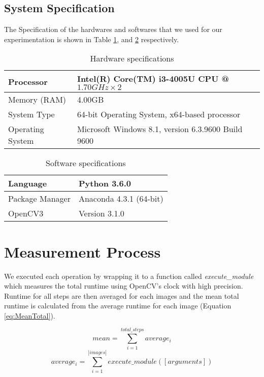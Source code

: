 \subsection{System Specification}
The Specification of the hardwares and softwares that we used for our experimentation is shown in Table \ref{table:HardwareSpecification}, and \ref{table:SoftwareSpecification} respectively.

\begin{table}[hb]
\centering
\caption{Hardware specifications}
\label{table:HardwareSpecification}
\begin{tabular}{|l|l|}
\hline
Processor & Intel(R) Core(TM) i3-4005U CPU @ $1.70GHz \times 2$ \\
\hline
Memory (RAM) & 4.00GB \\ 
\hline
System Type & 64-bit Operating System, x64-based processor \\ 
\hline
Operating System & Microsoft Windows 8.1, version 6.3.9600 Build 9600 \\
\hline 
\end{tabular}
\end{table} 

\begin{table}[hb]
\centering
\caption{Software specifications}
\label{table:SoftwareSpecification}
\begin{tabular}{|l|l|}
\hline
Language & Python 3.6.0 \\ 
\hline
Package Manager & Anaconda 4.3.1 (64-bit) \\ 
\hline
OpenCV3 & Version 3.1.0 \\
\hline
\end{tabular}
\end{table} 

\section{Measurement Process}
We executed each operation by wrapping it to a function called {\it execute\_module} which measures the total runtime using OpenCV's clock with high precision. Runtime for all steps are then averaged for each images and the mean total runtime is calculated from the average runtime for each image (Equation \ref{eq:MeanTotal}).

\begin{equation}\label{eq:MeanTotal}
mean = \sum^{total\_steps}_{i=1}{average_i}
\end{equation}
\begin{equation}
average_i = \sum^{| images |}_{i=1}{execute\_module([arguments])}
\end{equation}

